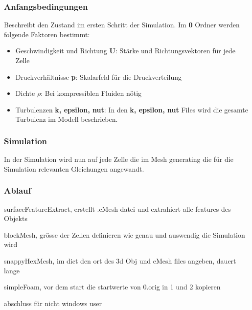 \subsubsection{Anfangsbedingungen \label{openfoam:section:Anfangsbedingungen}}
Beschreibt den Zustand im ersten Schritt der Simulation. Im \textbf{0} Ordner werden folgende Faktoren bestimmt:
\begin{itemize}
    \item Geschwindigkeit und Richtung \textbf{U}: Stärke und Richtungsvektoren für jede Zelle
    \item Druckverhältnisse \textbf{p}: Skalarfeld für die Druckverteilung
    \item Dichte $\rho$: Bei kompressiblen Fluiden nötig %
    \item Turbulenzen \textbf{k, epsilon, nut}: In den \textbf{k, epsilon, nut} Files wird die gesamte Turbulenz im Modell beschrieben.  
\end{itemize}



\subsubsection{Simulation\label{openfoam:section:Simulation}}
In der Simulation wird nun auf jede Zelle die im Mesh generating die für die Simulation relevanten Gleichungen angewandt. 




\subsubsection{Ablauf\label{openfoam:section:Ablauf}}
surfaceFeatureExtract, erstellt .eMesh datei und extrahiert alle features des Objekts

blockMesh, grösse der Zellen definieren wie genau und auswendig die Simulation wird

snappyHexMesh, im dict den ort des 3d Obj und eMesh files angeben, dauert lange

simpleFoam, vor dem start die startwerte von 0.orig in 1 und 2 kopieren

abschluss für nicht windows user


